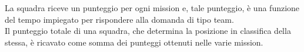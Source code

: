 La squadra riceve un punteggio per ogni mission e, tale punteggio, è una funzione del tempo impiegato per rispondere alla domanda di tipo team. \\
Il punteggio totale di una squadra, che determina la posizione in classifica della stessa, è ricavato come somma dei punteggi ottenuti nelle varie mission.
